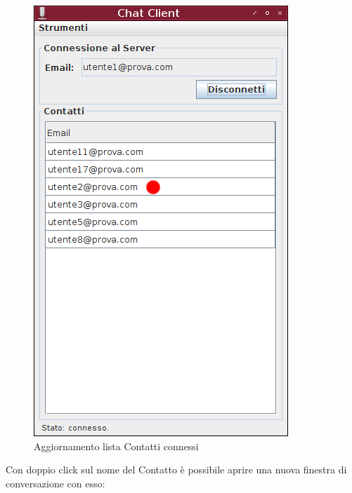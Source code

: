 \documentclass[a4paper, 11pt]{article} %
\begin{document}
\begin{figure}[H]
\includegraphics[height=1.2\textwidth]{images/client-3.png}
\vspace{-0.2cm}
\caption{Aggiornamento lista Contatti connessi}
\end{figure}
\clearpage
Con doppio click sul nome del Contatto \`e possibile aprire una nuova finestra di conversazione con esso:
\end{document}
